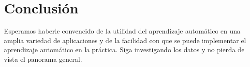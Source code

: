 \section{Conclusión}

Esperamos haberle convencido de la utilidad del aprendizaje automático en una 
amplia variedad de aplicaciones y de la facilidad con que se puede implementar el aprendizaje 
automático en la práctica. Siga investigando los datos y no pierda de vista el panorama general.






